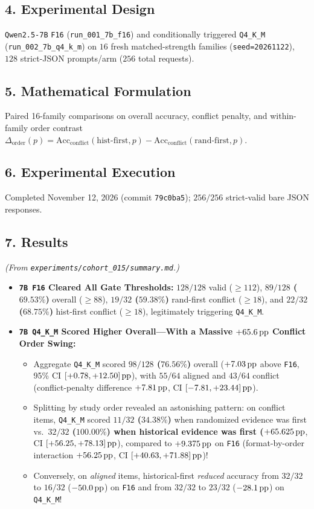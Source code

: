 \subsection*{4. Experimental Design}
\texttt{Qwen2.5-7B} \texttt{F16} (\texttt{run\_001\_7b\_f16}) and conditionally triggered \texttt{Q4\_K\_M} (\texttt{run\_002\_7b\_q4\_k\_m}) on $16$ fresh matched-strength families (\texttt{seed=20261122}), $128$ strict-JSON prompts/arm ($256$ total requests).

\subsection*{5. Mathematical Formulation}
Paired 16-family comparisons on overall accuracy, conflict penalty, and within-family order contrast $\Delta_{\mathrm{order}}(p) = \mathrm{Acc}_{\mathrm{conflict}}(\mathrm{hist\text{-}first}, p) - \mathrm{Acc}_{\mathrm{conflict}}(\mathrm{rand\text{-}first}, p)$.

\subsection*{6. Experimental Execution}
Completed November 12, 2026 (commit \texttt{79c0ba5}); $256/256$ strict-valid bare JSON responses.

\subsection*{7. Results}
\emph{(From \texttt{experiments/cohort\_015/summary.md}.)}
\begin{itemize}
  \item \textbf{\texttt{7B F16} Cleared All Gate Thresholds:} $128/128$ valid ($\ge 112$), \textbf{$89/128$ ($69.53\%$)} overall ($\ge 88$), \textbf{$19/32$ ($59.38\%$)} rand-first conflict ($\ge 18$), and \textbf{$22/32$ ($68.75\%$)} hist-first conflict ($\ge 18$), legitimately triggering \texttt{Q4\_K\_M}.
  \item \textbf{\texttt{7B Q4\_K\_M} Scored Higher Overall---With a Massive $+65.6\,\mathrm{pp}$ Conflict Order Swing:}
    \begin{itemize}
      \item Aggregate \texttt{Q4\_K\_M} scored \textbf{$98/128$ ($76.56\%$)} overall ($+7.03\,\mathrm{pp}$ above \texttt{F16}, 95\% CI $[+0.78, +12.50]\,\mathrm{pp}$), with $55/64$ aligned and $43/64$ conflict (conflict-penalty difference $+7.81\,\mathrm{pp}$, CI $[-7.81, +23.44]\,\mathrm{pp}$).
      \item Splitting by study order revealed an astonishing pattern: on conflict items, \texttt{Q4\_K\_M} scored \textbf{$11/32$ ($34.38\%$)} when randomized evidence was first vs.\ \textbf{$32/32$ ($100.00\%$)\textbf{ when historical evidence was first (}$+65.625\,\mathrm{pp}$}, CI $[+56.25, +78.13]\,\mathrm{pp}$), compared to $+9.375\,\mathrm{pp}$ on \texttt{F16} (format-by-order interaction \textbf{$+56.25\,\mathrm{pp}$}, CI $[+40.63, +71.88]\,\mathrm{pp}$)!
      \item Conversely, on \emph{aligned} items, historical-first \emph{reduced} accuracy from $32/32$ to $16/32$ ($-50.0\,\mathrm{pp}$) on \texttt{F16} and from $32/32$ to $23/32$ ($-28.1\,\mathrm{pp}$) on \texttt{Q4\_K\_M}!
    \end{itemize}
\end{itemize}

